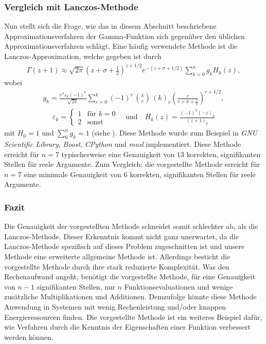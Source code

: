 \subsubsection{Vergleich mit Lanczos-Methode}
Nun stellt sich die Frage,
wie das in diesem Abschnitt beschriebene Approximationsverfahren
der Gamma-Funktion sich gegenüber den üblichen Approximationsverfahren schlägt.
Eine häufig verwendete Methode ist die Lanczos-Approximation,
welche gegeben ist durch
\begin{align}
\Gamma(z + 1)
\approx
\sqrt{2\pi} \left( z + \sigma + \frac{1}{2} \right)^{z + 1/2}
e^{-(z + \sigma + 1/2)} \sum_{k=0}^n g_k H_k(z)
,
\end{align}
wobei
\begin{align*}
g_k = \frac{e^\sigma \varepsilon_k (-1)^k}{\sqrt{2\pi}}
\sum_{r=0}^k (-1)^r \, \binom{k}{r} \, (k)_r
\left( \frac{e}{r + \sigma + \frac{1}{2}}\right)^{r + 1/2}
,
\end{align*}
\begin{align*}
\varepsilon_k
=
\begin{cases}
1 & \text{für } k = 0 \\
2 & \text{sonst}
\end{cases}
\quad \text{und}\quad
H_k(z)
=
\frac{(-1)^k (-z)_k}{(z+1)_k}
\end{align*}
mit $H_0 = 1$ und $\sum_0^n g_k = 1$ (siehe \cite{laguerre:lanczos}).
Diese Methode wurde zum Beispiel in
{\em GNU Scientific Library}, {\em Boost}, {\em CPython} und
{\em musl} implementiert.
Diese Methode erreicht für $n = 7$ typischerweise eine Genauigkeit von $13$
korrekten, signifikanten Stellen für reele Argumente.
Zum Vergleich: die vorgestellte Methode erreicht für $n = 7$
eine minimale Genauigkeit von $6$ korrekten, signifikanten Stellen
für reele Argumente.

\subsubsection{Fazit}
Die Genauigkeit der vorgestellten Methode schneidet somit schlechter ab,
als die Lanczos-Methode.
Dieser Erkenntnis kommt nicht ganz unerwartet,
da die Lanczos-Methode spezifisch auf dieses Problem zugeschnitten ist und
unsere Methode eine erweiterte allgemeine Methode ist.
Allerdings besticht die vorgestellte Methode
durch ihre stark reduzierte Komplexität. %
Was den Rechenaufwand angeht,
benötigt die vorgestellte Methode,
für eine Genauigkeit von $n-1$ signifikanten Stellen,
nur $n$ Funktionsevaluationen
und wenige zusätzliche Multiplikationen und Additionen.
Demzufolge könnte diese Methode Anwendung in Systemen mit wenig Rechenleistung
und/oder knappen Energieressourcen finden.
Die vorgestellte Methode ist ein weiteres Beispiel dafür, 
wie Verfahren durch die Kenntnis der Eigenschaften einer Funktion 
verbessert werden können.